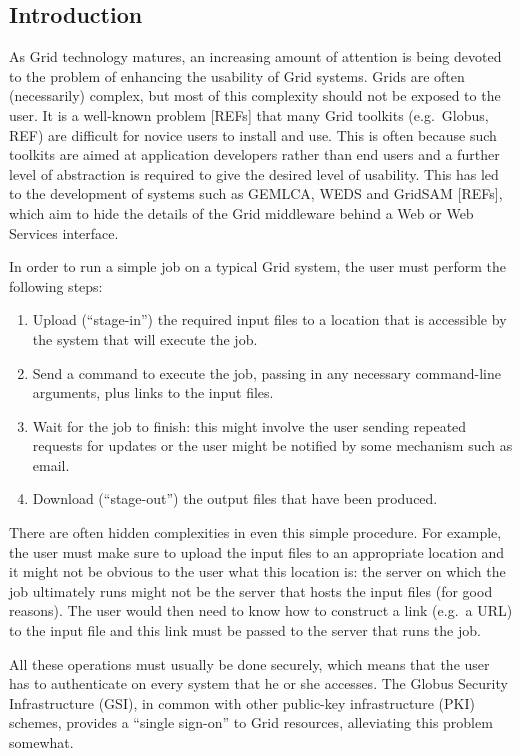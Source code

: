 \documentclass[a4paper]{article}
\begin{document}
\begin{multicols}{2}

\section{Introduction}
As Grid technology matures, an increasing amount of attention is being devoted to the problem of enhancing the usability of Grid systems.  Grids are often (necessarily) complex, but most of this complexity should not be exposed to the user.  It is a well-known problem [REFs] that many Grid toolkits (e.g.\ Globus, REF) are difficult for novice users to install and use.  This is often because such toolkits are aimed at application developers rather than end users and a further level of abstraction is required to give the desired level of usability.  This has led to the development of systems such as GEMLCA, WEDS and GridSAM [REFs], which aim to hide the details of the Grid middleware behind a Web or Web Services interface.

In order to run a simple job on a typical Grid system, the user must perform the following steps:

\begin{enumerate}
\item Upload (``stage-in'') the required input files to a location that is accessible by the system that will execute the job.
\item Send a command to execute the job, passing in any necessary command-line arguments, plus links to the input files.
\item Wait for the job to finish: this might involve the user sending repeated requests for updates or the user might be notified by some mechanism such as email.
\item Download (``stage-out'') the output files that have been produced.
\end{enumerate}

There are often hidden complexities in even this simple procedure.  For example, the user must make sure to upload the input files to an appropriate location and it might not be obvious to the user what this location is:  the server on which the job ultimately runs might not be the server that hosts the input files (for good reasons).  The user would then need to know how to construct a link (e.g.\ a URL) to the input file and this link must be passed to the server that runs the job.

All these operations must usually be done securely, which means that the user has to authenticate on every system that he or she accesses.  The Globus Security Infrastructure (GSI), in common with other public-key infrastructure (PKI) schemes, provides a ``single sign-on'' to Grid resources, alleviating this problem somewhat.


\end{multicols}
\end{document}
